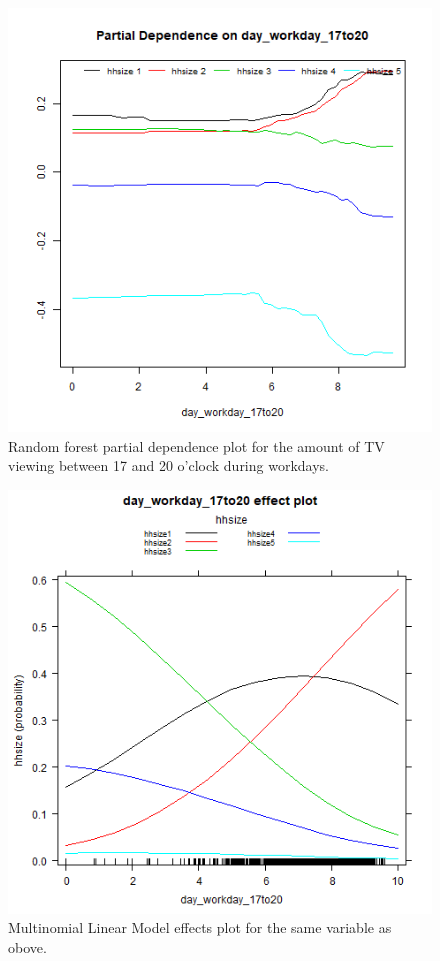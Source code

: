 \documentclass[]{article}
\begin{document}
\begin{figure}

{\centering \includegraphics[width=0.55\linewidth]{../data/partialplot.rf.day_workday_17to20} 

}

\caption{\label{fig:fig13} Random forest partial dependence plot for the amount of TV viewing between 17 and 20 o'clock during workdays. }\label{fig:unnamed-chunk-33}
\end{figure}

\begin{figure}

{\centering \includegraphics[width=0.55\linewidth]{../data/partialplot.mnr.day_workday_17to20} 

}

\caption{\label{fig:fig14} Multinomial Linear Model effects plot for the same variable as obove.}\label{fig:unnamed-chunk-34}
\end{figure}
\end{document}
